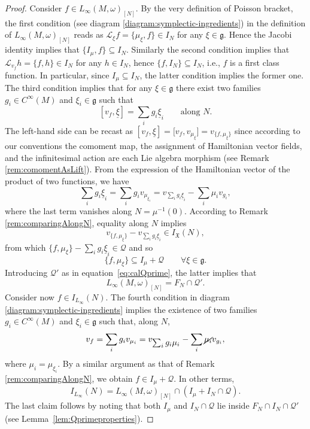\documentclass[10pt,a4paper]{amsart}
\numberwithin{equation}{section}
\newcommand{\g}{\mathfrak{g}}
\renewcommand{\L}{\mathscr{L}}
\renewcommand{\subset}{\subseteq}
\begin{document}
\begin{proof}
	Consider $f\in L_\infty(M,\omega)_{[N]}$.
	By the very definition of Poisson bracket, the first condition (see diagram \eqref{diagram:symplectic-ingredients}) in the definition of $L_\infty(M,\omega)_{[N]}$ reads as $\L_\xi f = \{\mu_\xi,f\} \in I_N$ for any $\xi \in \mathfrak{g}$.
	Hence the Jacobi identity implies that $\lbrace I_\mu, f\rbrace \subset I_N$.
	Similarly the second condition implies that $\L_{v_f} h = \lbrace f,h \rbrace \in I_N$ for any $h\in I_N$, hence $\{f,I_N\}\subset I_N$, i.e., $f$ is a first class function. In particular, since $I_\mu\subset I_N$, the latter condition implies the former one.
	The third condition implies that for any $\xi \in \g$ there exist two families $g_i \in C^\infty(M)$ and $\xi_i \in \g$ such that
	\[
		[v_f,\underline{\xi}] = \sum_i g_i \underline{\xi}_i \qquad \text{along $N$.}
	\]
	The left-hand side can be recast as
	$[v_f,\underline{\xi}] = \bigl[v_f,v_{\mu_\xi}\bigr] = v_{\{f,\mu_\xi\}}$ since according to our conventions the comoment map, the assignment of Hamiltonian vector fields, and the infinitesimal action are each Lie algebra morphism (see Remark \ref{rem:comomentAsLift}).
	From the expression of the Hamiltonian vector of the product of two functions, we have
	\[
		\sum_i g_i\underline{\xi}_i =
		\sum_i g_i v_{\mu_{\xi_i}} =
		v_{\sum_i g_i \underline{\xi}_i} - \sum_i \mu_i v_{g_i}  ,
	\]
	where the last term vanishes along $N=\mu^{-1}(0)$.
	According to Remark \ref{rem:comparingAlongN}, equality along $N$ implies
	\[
		v_{\{f,\mu_\xi\}} - v_{\sum_i g_i \underline{\xi}_i} \in I_{\mathfrak{X}}(N),
	\]
	from which $\{f,\mu_\xi\} - \sum_i g_i \underline{\xi}_i \in \mathcal{Q}$ and so
	\[
		\{f,\mu_\xi\} \subset I_\mu + \mathcal{Q} \qquad \forall \xi \in \g.
	\]
	Introducing $\mathcal{Q}'$ as in equation~\eqref{eq:calQprime}, the latter implies that
	\[
		L_\infty(M,\omega)_{[N]} = F_N \cap \mathcal{Q'}.
	\]
	Consider now $f \in I_{L_\infty}(N)$. The fourth condition in diagram \eqref{diagram:symplectic-ingredients} implies the existence of two families $g_i \in C^\infty(M)$ and $\xi_i \in \g$ such that, along $N$,
	\[
		v_f = \sum_i g_i  v_{\mu_i} =
		v_{\textstyle\sum_i g_i\mu_i} - \sum_i \cancel{\mu_i}v_{g_i} ,
	\]
	where $\mu_i = \mu_{\xi_i}$.
	By a similar argument as that of Remark \ref{rem:comparingAlongN}, we obtain $f\in I_\mu + \mathcal{Q}$.
	In other terms,
	\[
		I_{L_\infty}(N)=L_\infty(M,\omega)_{[N]} \cap (I_\mu+ I_N \cap\mathcal{Q}).
	\]
	The last claim follows by noting that both $I_\mu$ and $I_N\cap\mathcal{Q}$ lie inside $F_N\cap I_N \cap \mathcal{Q}'$ (see Lem\-ma~\ref{lem:Qprimeproperties}).
\end{proof}
\end{document}

